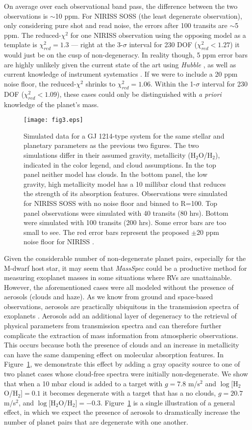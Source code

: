 \documentclass[iop]{emulateapj}
\begin{document}
On average over each observational band pass, the difference between the two observations is $\sim$10 ppm. For NIRISS SOSS (the least degenerate observation), only considering pure shot and read noise, the errors after 100 transits are $\sim$5 ppm. The reduced-$\chi^2$ for one NIRISS observation using the opposing model as a template is $\chi_{red}^2=1.3$ --- right at the 3-$\sigma$ interval for 230 DOF ($\chi_{red}^2< 1.27$) it would just be on the cusp of non-degeneracy. In reality though, 5 ppm error bars are highly unlikely given the current state of the art using \emph{Hubble} \citep[e.g.][]{lin16}, as well as current knowledge of instrument systematics \citep{gre16}. If we were to include a 20 ppm noise floor, the reduced-$\chi^2$ shrinks to $\chi_{red}^2=1.06$. Within the 1-$\sigma$ interval for 230 DOF ($\chi_{red}^2< 1.09$), these cases could only be distinguished with \emph{a priori} knowledge of the planet's mass.  
\begin{figure}[ht]
 \texttt{[image: fig3.eps]}
\caption{Simulated data for a GJ 1214-type system for the same stellar and planetary parameters as the previous two figures. The two simulations differ in their assumed gravity, metallicity (H$_2$O/H$_2$), indicated in the color legend, and cloud assumptions. In the top panel neither model has clouds. In the bottom panel, the low gravity, high metallicity model has a 10 millibar cloud that reduces the strength of its absorption features. Observations were simulated for NIRISS SOSS with no noise floor and binned to R=100. Top panel observations were simulated with 40 transits (80 hrs). Bottom were simulated with 100 transits (200 hrs). Some error bars are too small to see.  The red error bars represent the proposed $\pm$20 ppm noise floor for NIRISS \citep{gre16}. \label{fig3}}
\end{figure}
Given the considerable number of non-degenerate planet pairs, especially for the M-dwarf host star, it may seem that \textit{MassSpec} could be a productive method for measuring exoplanet masses in some situations where RVs are unattainable.  However, the aforementioned cases were all modeled without the presence of aerosols (clouds and haze). As we know from ground and space-based observations, aerosols are practically ubiquitous in the transmission spectra of exoplanets \citep[e.g.][]{kre14,sin16}.  Aerosols add an additional layer of degeneracy to the retrieval of physical parameters from transmission spectra and can therefore further complicate the extraction of mass information from atmospheric observations.  This occurs because both the presence of clouds and an increase in metallicity can have the same dampening effect on molecular absorption features.  In Figure~\ref{fig3}, we demonstrate this effect by adding a gray opacity source to one of two planet cases whose cloud-free spectra were initially non-degenerate. We show that when a 10 mbar cloud is added to a target with $g = 7.8$ m/s$^2$ and $\log[$H$_2$O/H$_2]=0.1$ it becomes degenerate with a target that has a no clouds, $g=20.7$ m/s$^2$, and $\log[$H$_2$O/H$_2]=-0.3$. Figure~\ref{fig3} is a single illustration of a general effect, in which we expect the presence of aerosols to dramatically increase the number of planet pairs that are degenerate with one another.     
\end{document}
